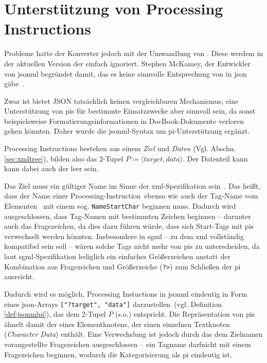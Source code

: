 \section{Unterstützung von Processing Instructions}

Probleme hatte der Konverter jedoch mit der Umwandlung von . Diese werdem in der aktuellen Version der einfach ignoriert. Stephen McKamey, der Entwickler von \acrshort{jsonml} begründet damit, das es keine sinnvolle Entsprechung von  in \acrshort{json} gäbe~\cite{mckamey2006xml}.

Zwar ist bietet JSON tatsächlich keinen vergleichbaren Mechanismus, eine Unterstützung von \glspl{pi} für bestimmte Einsatzzwecke aber sinnvoll sein, da sonst beispielsweise Formatierungsinformationen in DocBook-Dokumente verloren gehen könnten. Daher wurde die \acrshort{jsonml}-Syntax um \acrshort{pi}-Unterstützung ergänzt.

Processing Instructions bestehen aus einem \emph{Ziel} und \emph{Daten} (Vgl. Abschn. \ref{sec:xmltree}), bilden also das 2-Tupel $P \coloneqq \langle target, data \rangle$. Der Datenteil kann kann dabei auch der leer sein.

Das Ziel muss ein gültiger Name im Sinne der \acrshort{xml}-Spezifikation sein~\cite[{Regel~[17]}]{maler2008xml}. Das heißt, dass der Name einer Processing-Instruction\ ebenso wie auch der Tag-Name vom Elementen~\cite[{Regel~[40]}]{maler2008xml} mit einem sog. \texttt{NameStartChar} beginnen muss. Dadurch wird ausgeschlossen, dass Tag-Namen mit bestimmten Zeichen beginnen -- darunter auch das Fragezeichen, da dies dazu führen würde, dass sich Start-Tags mit \glspl{pi} verwechselt werden könnten. Insbesondere in \acrshort{sgml} -- zu dem \acrshort{xml} vollständig kompatibel sein soll -- wären solche Tags nicht mehr von \glspl{pi} zu unterscheiden, da laut \acrshort{sgml}-Spezifikation lediglich ein einfaches Größerzeichen anstatt der Kombination aus Fragezeichen und Größerzeiche (\texttt{?>}) zum Schließen der \gls{pi} ausreicht.


Dadurch wird es möglich, Processing Instuctions in \acrshort{jsonml} eindeutig in Form eines \acrshort{json}-Arrays \texttt{["?target", "data"]} darzustellen~(vgl. Definition \ref{def:jsonmlpi}), das dem 2-Tupel $P$ (s.o.) entspricht. Die Repräsentation von \glspl{pi} ähnelt damit der eines Elementknotens, der einen einzelnen Textknoten (\emph{Character Data}) enthält. Eine Verwechslung ist jedoch durch das dem Zielnamen vorangestellte Fragezeichen ausgeschlossen -- ein Tagname darfnicht mit einem Fragezeichen beginnen, wodurch die Kategorisierung als \gls{pi} eindeutig ist.

